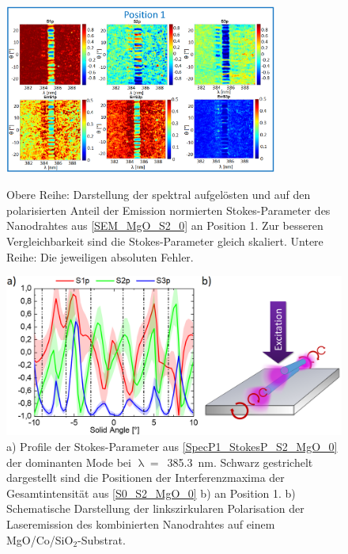 \begin{figure}[h]
\centering
\includegraphics[width=0.8\textwidth]{Bilder/MgO/SpecP1_StokesP_S2_MgO_0}
\caption{Obere Reihe: Darstellung der spektral aufgelösten und auf den polarisierten Anteil der Emission normierten Stokes-Parameter des Nanodrahtes aus \autoref{SEM_MgO_S2_0} an Position 1. Zur besseren Vergleichbarkeit sind die Stokes-Parameter gleich skaliert. Untere Reihe: Die jeweiligen absoluten Fehler.}
\label{SpecP1_StokesP_S2_MgO_0}
\includegraphics[width=.6\textwidth]{Bilder/MgO/SpecP1_StokesP_Line_S2_MgO_0}
\caption{a) Profile der Stokes-Parameter aus \autoref{SpecP1_StokesP_S2_MgO_0} der dominanten Mode bei \mbox{$\uplambda=$ 385.3 nm}. Schwarz gestrichelt dargestellt sind die Positionen der Interferenzmaxima der Gesamtintensität aus \autoref{S0_S2_MgO_0} b) an Position 1. b) Schematische Darstellung der linkszirkularen Polarisation der Laseremission des kombinierten Nanodrahtes auf einem MgO/Co/SiO$_\text{2}$-Substrat.}
\label{SpecP1_StokesP_Line_S2_MgO_0}
\end{figure}
